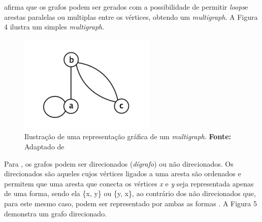 \par {} afirma que os grafos podem ser gerados com a possibilidade de permitir \textit{loops}\footnotemark[4] e arestas paralelas ou multiplas entre os vértices, obtendo um \textit{multigraph}. A Figura 4 ilustra um simples \textit{multigraph}.


\begin{figure}[h!]
	\centerline{\includegraphics[scale=0.9]{./imagens/multigraph_example.png}}
	\caption[Ilustração de uma representação gráfica de um \textit{multigraph}]
	{Ilustração de uma representação gráfica de um \textit{multigraph}. \textbf{Fonte:} Adaptado de }
	\label{fig:exemplo1}
\end{figure}

\newpage

\par Para , os grafos podem ser direcionados (\textit{dígrafo}) ou não direcionados. Os  direcionados são aqueles cujos vértices ligados a uma aresta são ordenados e permitem que uma aresta que conecta os vértices \textit{x} e \textit{y} seja representada apenas de uma forma, sendo ela \{x, y\} ou \{y, x\}, ao contrário dos não direcionados que, para este mesmo caso, podem ser representado por ambas as formas \cite{rocha_algoritmos_particionamento_banco_dados_orientado_grafos}. A Figura 5 demonstra um grafo direcionado.

